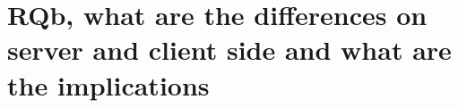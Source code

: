 \documentclass[../thesis.tex]{subfiles}
\begin{document}


\noindent

\section{RQb, what are the differences on server and client side and what are the implications}
\end{document}
